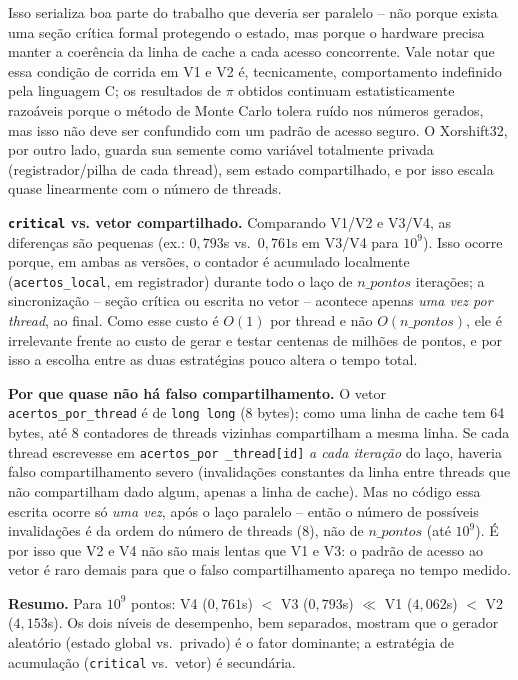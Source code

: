 \documentclass[a4paper,12pt]{article}
\begin{document}
Isso serializa boa parte do trabalho que deveria ser paralelo -- não porque
exista uma seção crítica formal protegendo o estado, mas porque o hardware
precisa manter a coerência da linha de cache a cada acesso concorrente. Vale
notar que essa condição de corrida em V1 e V2 é, tecnicamente, comportamento
indefinido pela linguagem C; os resultados de $\pi$ obtidos continuam
estatisticamente razoáveis porque o método de Monte Carlo tolera ruído nos
números gerados, mas isso não deve ser confundido com um padrão de acesso
seguro. O Xorshift32, por outro lado, guarda sua semente como variável
totalmente privada (registrador/pilha de cada thread), sem estado
compartilhado, e por isso escala quase linearmente com o número de threads.

\textbf{\texttt{critical} vs. vetor compartilhado.} Comparando V1/V2 e V3/V4, as diferenças são pequenas
(ex.: $0,793$s vs.\ $0,761$s em V3/V4 para $10^9$). Isso ocorre porque, em ambas as versões, o contador é
acumulado localmente (\texttt{acertos\_local}, em registrador) durante todo o laço de $n\_pontos$
iterações; a sincronização -- seção crítica ou escrita no vetor -- acontece apenas \emph{uma vez por
thread}, ao final. Como esse custo é $O(1)$ por thread e não $O(n\_pontos)$, ele é irrelevante frente ao
custo de gerar e testar centenas de milhões de pontos, e por isso a escolha entre as duas estratégias
pouco altera o tempo total.

\textbf{Por que quase não há falso compartilhamento.} O vetor \texttt{acertos\_por\_thread} é de
\texttt{long long} (8 bytes); como uma linha de cache tem 64 bytes, até 8 contadores de threads vizinhas
compartilham a mesma linha. Se cada thread escrevesse em \texttt{acertos\_por
\_thread[id]} \emph{a cada
iteração} do laço, haveria falso compartilhamento severo (invalidações constantes da linha entre threads
que não compartilham dado algum, apenas a linha de cache). Mas no código essa escrita ocorre só
\emph{uma vez}, após o laço paralelo -- então o número de possíveis invalidações é da ordem do número de
threads ($8$), não de $n\_pontos$ (até $10^9$). É por isso que V2 e V4 não são mais lentas que V1 e V3:
o padrão de acesso ao vetor é raro demais para que o falso compartilhamento apareça no tempo medido.

\textbf{Resumo.} Para $10^9$ pontos: V4 ($0,761$s) $<$ V3 ($0,793$s) $\ll$ V1 ($4,062$s) $<$ V2
($4,153$s). Os dois níveis de desempenho, bem separados, mostram que o gerador aleatório (estado global vs.\
privado) é o fator dominante; a estratégia de acumulação (\texttt{critical} vs.\ vetor) é secundária.
\end{document}
